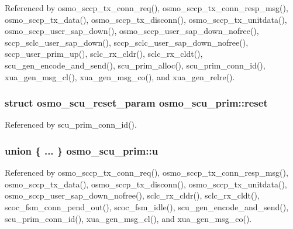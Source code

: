 Referenced by osmo\+\_\+sccp\+\_\+tx\+\_\+conn\+\_\+req(), osmo\+\_\+sccp\+\_\+tx\+\_\+conn\+\_\+resp\+\_\+msg(), osmo\+\_\+sccp\+\_\+tx\+\_\+data(), osmo\+\_\+sccp\+\_\+tx\+\_\+disconn(), osmo\+\_\+sccp\+\_\+tx\+\_\+unitdata(), osmo\+\_\+sccp\+\_\+user\+\_\+sap\+\_\+down(), osmo\+\_\+sccp\+\_\+user\+\_\+sap\+\_\+down\+\_\+nofree(), sccp\+\_\+sclc\+\_\+user\+\_\+sap\+\_\+down(), sccp\+\_\+sclc\+\_\+user\+\_\+sap\+\_\+down\+\_\+nofree(), sccp\+\_\+user\+\_\+prim\+\_\+up(), sclc\+\_\+rx\+\_\+cldr(), sclc\+\_\+rx\+\_\+cldt(), scu\+\_\+gen\+\_\+encode\+\_\+and\+\_\+send(), scu\+\_\+prim\+\_\+alloc(), scu\+\_\+prim\+\_\+conn\+\_\+id(), xua\+\_\+gen\+\_\+msg\+\_\+cl(), xua\+\_\+gen\+\_\+msg\+\_\+co(), and xua\+\_\+gen\+\_\+relre().

\subsubsection[{reset}]{\setlength{\rightskip}{0pt plus 5cm}struct {\bf osmo\+\_\+scu\+\_\+reset\+\_\+param} osmo\+\_\+scu\+\_\+prim\+::reset}\label{structosmo__scu__prim_ae5b5437ca1a507c684dc1c8a84ea72e0}


Referenced by scu\+\_\+prim\+\_\+conn\+\_\+id().

\subsubsection[{u}]{\setlength{\rightskip}{0pt plus 5cm}union \{ ... \}   osmo\+\_\+scu\+\_\+prim\+::u}\label{structosmo__scu__prim_a7c686e340a1f45662b605811ea39b7d0}


Referenced by osmo\+\_\+sccp\+\_\+tx\+\_\+conn\+\_\+req(), osmo\+\_\+sccp\+\_\+tx\+\_\+conn\+\_\+resp\+\_\+msg(), osmo\+\_\+sccp\+\_\+tx\+\_\+data(), osmo\+\_\+sccp\+\_\+tx\+\_\+disconn(), osmo\+\_\+sccp\+\_\+tx\+\_\+unitdata(), osmo\+\_\+sccp\+\_\+user\+\_\+sap\+\_\+down\+\_\+nofree(), sclc\+\_\+rx\+\_\+cldr(), sclc\+\_\+rx\+\_\+cldt(), scoc\+\_\+fsm\+\_\+conn\+\_\+pend\+\_\+out(), scoc\+\_\+fsm\+\_\+idle(), scu\+\_\+gen\+\_\+encode\+\_\+and\+\_\+send(), scu\+\_\+prim\+\_\+conn\+\_\+id(), xua\+\_\+gen\+\_\+msg\+\_\+cl(), and xua\+\_\+gen\+\_\+msg\+\_\+co().

